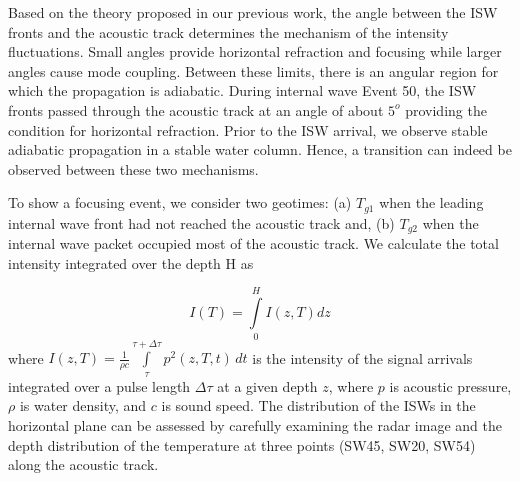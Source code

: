 
Based on the theory proposed in our previous work, the angle between
the ISW fronts and the acoustic track determines the mechanism of
the intensity fluctuations. Small angles provide horizontal
refraction and focusing while larger angles cause mode coupling.
Between these limits, there is an angular region for which the
propagation is adiabatic.  During internal wave Event 50, the ISW
fronts passed through the acoustic track at an angle of about $5^o$
providing the condition for horizontal refraction. Prior to the ISW
arrival, we observe stable adiabatic propagation in a stable water
column. Hence, a transition can indeed be observed between these two
mechanisms.

To show a focusing event, we consider two geotimes: (a) $T_{g1}$ when the
leading internal wave front had not reached the acoustic track and,
(b) $T_{g2}$ when the internal wave packet occupied most of the acoustic
track. We calculate the total intensity integrated over the depth H
as

\begin{equation}\label{eq:intensity}
I(T)=\displaystyle\int\limits^H_0I(z,T)dz
\end{equation}
where
$I(z,T)=\displaystyle\frac{1}{{\rho}c}\int\limits^{\tau+\Delta\tau}_{\tau}p^2(z,T,t)\,dt$
is the intensity of the signal arrivals integrated over a pulse
length $\Delta\tau$ at a given depth $z$, where $p$ is acoustic
pressure,$\rho$ is water density, and $c$ is sound speed. The
distribution of the ISWs in the horizontal plane can be assessed by
carefully examining the radar image and the depth distribution of
the temperature at three points (SW45, SW20, SW54) along the
acoustic track.

